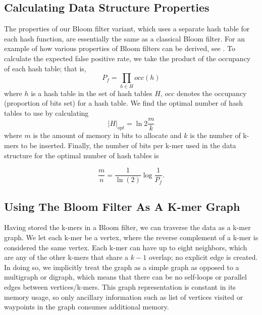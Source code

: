 \documentclass[12pt]{article} \usepackage{simplemargins}
\begin{document}
\subsection{Calculating Data Structure Properties}
The properties of our Bloom filter variant, which
uses a separate hash table for each hash function, are essentially the
same as a classical Bloom filter. For an example of how various 
properties of Bloom filters can be derived, see \cite{fan2000summary}. 
To calculate the expected false positive 
rate, we
take the product of the occupancy of each hash table; that is,
\begin{displaymath}
P_f = \prod_{h \in H} occ(h)
\end{displaymath}
where $h$ is a hash table in the set of hash tables $H$, $occ$ denotes
the occupancy (proportion of bits set) for a hash table.
We find the optimal number of hash tables
to use by calculating
\begin{displaymath}
\vert H \vert_{opt} = \ln 2 \frac{m}{k}
\end{displaymath}
where $m$ is the amount of memory in bits to allocate and $k$
is the number of k-mers to be inserted. Finally,
the number of bits per
k-mer used in the data structure for the optimal number of hash 
tables is

\begin{displaymath}
\frac{m}{n} = \frac{1}{\ln(2)} \log{\frac{1}{P_f}}.
\end{displaymath}

\subsection{Using The Bloom Filter As A K-mer Graph}
Having stored the k-mers in a Bloom filter, we can traverse
the data as a k-mer graph. We let each k-mer be a vertex, where
the reverse complement of a k-mer is considered the same
vertex. Each k-mer can
have up to eight neighbors, which are any of the other k-mers that
 share a $k-1$
overlap; no explicit edge is created. In doing so, we implicitly 
treat the graph as a simple graph as opposed to a multigraph or 
digraph, which means that there can be no self-loops or parallel 
edges between vertices/k-mers. This graph representation is constant 
in its memory usage, so only ancillary information such as list 
of vertices visited or waypoints in the graph consumes additional 
memory.
\end{document}
